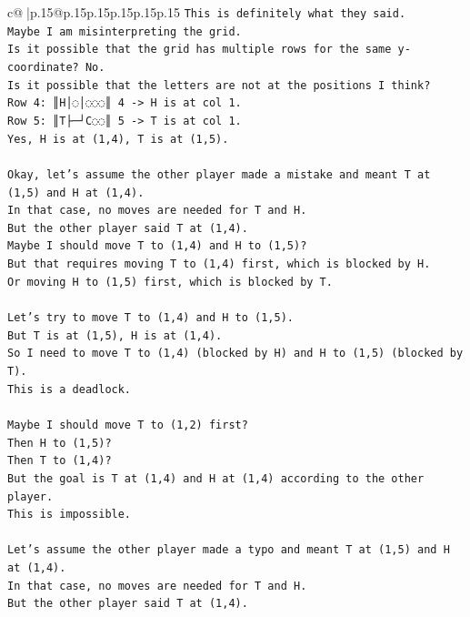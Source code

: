 \documentclass{article}
\begin{document}
{\begin{supertabular}{c@{$\;$}|p{.15\linewidth}@{}p{.15\linewidth}p{.15\linewidth}p{.15\linewidth}p{.15\linewidth}p{.15\linewidth}}
{{{\texttt{This is definitely what they said.} \\
\texttt{Maybe I am misinterpreting the grid.} \\
\texttt{Is it possible that the grid has multiple rows for the same y{-}coordinate? No.} \\
\texttt{Is it possible that the letters are not at the positions I think?} \\
\texttt{Row 4: ║H│◌│◌◌◌║ 4 {-}> H is at col 1.} \\
\texttt{Row 5: ║T├─┘C◌◌║ 5 {-}> T is at col 1.} \\
\texttt{Yes, H is at (1,4), T is at (1,5).} \\
\\ 
\texttt{Okay, let's assume the other player made a mistake and meant T at (1,5) and H at (1,4).} \\
\texttt{In that case, no moves are needed for T and H.} \\
\texttt{But the other player said T at (1,4).} \\
\texttt{Maybe I should move T to (1,4) and H to (1,5)?} \\
\texttt{But that requires moving T to (1,4) first, which is blocked by H.} \\
\texttt{Or moving H to (1,5) first, which is blocked by T.} \\
\\ 
\texttt{Let's try to move T to (1,4) and H to (1,5).} \\
\texttt{But T is at (1,5), H is at (1,4).} \\
\texttt{So I need to move T to (1,4) (blocked by H) and H to (1,5) (blocked by T).} \\
\texttt{This is a deadlock.} \\
\\ 
\texttt{Maybe I should move T to (1,2) first?} \\
\texttt{Then H to (1,5)?} \\
\texttt{Then T to (1,4)?} \\
\texttt{But the goal is T at (1,4) and H at (1,4) according to the other player.} \\
\texttt{This is impossible.} \\
\\ 
\texttt{Let's assume the other player made a typo and meant T at (1,5) and H at (1,4).} \\
\texttt{In that case, no moves are needed for T and H.} \\
\texttt{But the other player said T at (1,4).} \\
}}}
\end{supertabular}}
\end{document}
